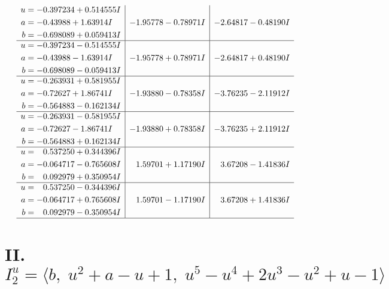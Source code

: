 \documentclass[1p]{elsarticle_modified}
\theoremstyle{definition}
\begin{document}
$$\begin{array}{c|c|c}
\begin{aligned}
u &= -0.397234 + 0.514555 I \\
a &= -0.43988 + 1.63914 I \\
b &= -0.698089 + 0.059413 I\end{aligned}
 & -1.95778 - 0.78971 I & -2.64817 - 0.48190 I \\ \hline\begin{aligned}
u &= -0.397234 - 0.514555 I \\
a &= -0.43988 - 1.63914 I \\
b &= -0.698089 - 0.059413 I\end{aligned}
 & -1.95778 + 0.78971 I & -2.64817 + 0.48190 I \\ \hline\begin{aligned}
u &= -0.263931 + 0.581955 I \\
a &= -0.72627 + 1.86741 I \\
b &= -0.564883 - 0.162134 I\end{aligned}
 & -1.93880 - 0.78358 I & -3.76235 - 2.11912 I \\ \hline\begin{aligned}
u &= -0.263931 - 0.581955 I \\
a &= -0.72627 - 1.86741 I \\
b &= -0.564883 + 0.162134 I\end{aligned}
 & -1.93880 + 0.78358 I & -3.76235 + 2.11912 I \\ \hline\begin{aligned}
u &= \phantom{-}0.537250 + 0.344396 I \\
a &= -0.064717 - 0.765608 I \\
b &= \phantom{-}0.092979 + 0.350954 I\end{aligned}
 & \phantom{-}1.59701 + 1.17190 I & \phantom{-}3.67208 - 1.41836 I \\ \hline\begin{aligned}
u &= \phantom{-}0.537250 - 0.344396 I \\
a &= -0.064717 + 0.765608 I \\
b &= \phantom{-}0.092979 - 0.350954 I\end{aligned}
 & \phantom{-}1.59701 - 1.17190 I & \phantom{-}3.67208 + 1.41836 I\\
 \hline 
 \end{array}$$\newpage\newpage\renewcommand{\arraystretch}{1}
\centering \section*{II. $I^u_{2}= \langle b,\;u^2+a- u+1,\;u^5- u^4+2 u^3- u^2+u-1 \rangle$}
\end{document}
